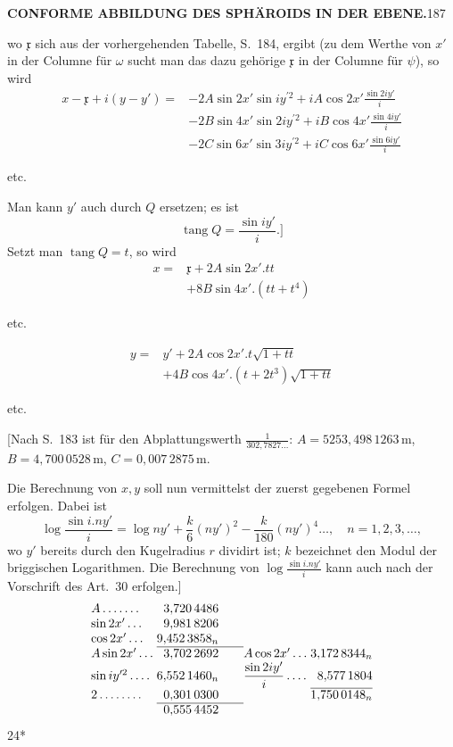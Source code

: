 \par\clearpage
\noindent\null\hfill{\small\textbf{CONFORME ABBILDUNG DES SPHÄROIDS IN DER EBENE.}}\hfill187\par\medskip
\noindent wo \(\mathfrak{x}\) sich aus der vorhergehenden Tabelle, S.~184, ergibt (zu dem Werthe von \(x'\) in der Columne für \(\omega\) sucht man das dazu gehörige \(\mathfrak{x}\) in der Columne für \(\psi\)), so wird
\[
\begin{aligned}
x-\mathfrak{x}+i(y-y')={}&-2A\sin2x'\sin iy^{\prime 2}+iA\cos2x'\frac{\sin2iy'}{i}\\
&-2B\sin4x'\sin2iy^{\prime 2}+iB\cos4x'\frac{\sin4iy'}{i}\\
&-2C\sin6x'\sin3iy^{\prime 2}+iC\cos6x'\frac{\sin6iy'}{i}
\end{aligned}
\]
{\centering etc.\par}
Man kann \(y'\) auch durch \(Q\) ersetzen; es ist
\[\operatorname{tang}Q=\frac{\sin iy'}{i}.]\]
Setzt man \(\operatorname{tang}Q=t\), so wird
\[
\begin{aligned}
x={}&\mathfrak{x}+2A\sin2x'.tt\\
&+8B\sin4x'.(tt+t^4)
\end{aligned}
\]
{\centering etc.\par}
\[
\begin{aligned}
y={}&y'+2A\cos2x'.t\sqrt{1+tt}\\
&+4B\cos4x'.(t+2t^3)\sqrt{1+tt}
\end{aligned}
\]
{\centering etc.\par}
[Nach S.~183 ist für den Abplattungswerth \(\frac1{302{,}7827\ldots}\): \(A=5253{,}498\,1263\,\mathrm{m}\), \(B=4{,}700\,0528\,\mathrm{m}\), \(C=0{,}007\,2875\,\mathrm{m}\).

Die Berechnung von \(x,y\) soll nun vermittelst der zuerst gegebenen Formel erfolgen. Dabei ist
\[
\log\frac{\sin i.ny'}{i}=\log ny'+\frac{k}{6}(ny')^2-\frac{k}{180}(ny')^4\ldots,\quad n=1,2,3,\ldots,
\]
\noindent wo \(y'\) bereits durch den Kugelradius \(r\) dividirt ist; \(k\) bezeichnet den Modul der briggischen Logarithmen. Die Berechnung von \(\log\frac{\sin i.ny'}{i}\) kann auch nach der Vorschrift des Art.~30 erfolgen.]
\[
\begin{array}{@{}l@{\;}r@{\qquad}l@{\;}r@{}}
A\,.\,.\,.\,.\,.\,.\,.&3{,}720\,4486&&\\
\sin2x'\,.\,.\,.&9{,}981\,8206&&\\
\cos2x'\,.\,.\,.&9{,}452\,3858_n&&\\\cline{2-2}
A\sin2x'\,.\,.\,.&3{,}702\,2692&A\cos2x'\,.\,.\,.&3{,}172\,8344_n\\
\sin iy^{\prime 2}\,.\,.\,.\,.&6{,}552\,1460_n&\dfrac{\sin2iy'}{i}\,.\,.\,.\,.&8{,}577\,1804\\\cline{4-4}
2\,.\,.\,.\,.\,.\,.\,.\,.&0{,}301\,0300&&1{,}750\,0148_n\\\cline{2-2}
&0{,}555\,4452&&
\end{array}
\]
\noindent\null\hfill{\small24*}\hspace*{.12\linewidth}\par

